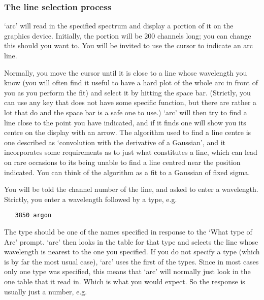 
\subsubsection{\label{techno10select}The line selection process}

   `arc' will read in the specified spectrum and display a portion of it
   on the graphics device.  Initially, the portion will be 200 channels
   long; you can change this should you want to.  You will be invited to
   use the cursor to indicate an arc line.

   Normally, you move the cursor until it is close to a line whose
   wavelength you know (you will often find it useful to have a hard
   plot of the whole arc in front of you as you perform the fit) and
   select it by hitting the space bar.  (Strictly, you can use any key
   that does not have some specific function, but there are rather a lot
   that do and the space bar is a safe one to use.)  `arc' will then try
   to find a line close to the point you have indicated, and if it finds
   one will show you its centre on the display with an arrow.  The
   algorithm used to find a line centre is one described as `convolution
   with the derivative of a Gaussian', and it incorporates some
   requirements as to just what constitutes a line, which can lead on
   rare occasions to its being unable to find a line centred near the
   position indicated.  You can think of the algorithm as a fit to a
   Gaussian of fixed sigma.

   You will be told the channel number of the line, and asked to enter a
   wavelength.  Strictly, you enter a wavelength followed by a type, e.g.

\begin{verbatim}
   3850 argon
\end{verbatim}

   The type should be one of the names specified in response to the
   `What type of Arc' prompt.  `arc' then looks in the table for that
   type and selects the line whose wavelength is nearest to the one you
   specified. If you do not specify a type (which is by far the most
   usual case), `arc' uses the first of the types.  Since in most cases
   only one type was specified, this means that `arc' will normally just
   look in the one table that it read in.  Which is what you would
   expect.  So the response is usually just a number, e.g.

